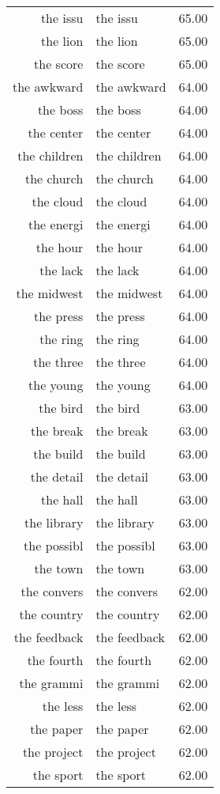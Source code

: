 \begin{table}[ht]
\begin{tabular}{rlr}
  the issu & the issu & 65.00 \\ 
  the lion & the lion & 65.00 \\ 
  the score & the score & 65.00 \\ 
  the awkward & the awkward & 64.00 \\ 
  the boss & the boss & 64.00 \\ 
  the center & the center & 64.00 \\ 
  the children & the children & 64.00 \\ 
  the church & the church & 64.00 \\ 
  the cloud & the cloud & 64.00 \\ 
  the energi & the energi & 64.00 \\ 
  the hour & the hour & 64.00 \\ 
  the lack & the lack & 64.00 \\ 
  the midwest & the midwest & 64.00 \\ 
  the press & the press & 64.00 \\ 
  the ring & the ring & 64.00 \\ 
  the three & the three & 64.00 \\ 
  the young & the young & 64.00 \\ 
  the bird & the bird & 63.00 \\ 
  the break & the break & 63.00 \\ 
  the build & the build & 63.00 \\ 
  the detail & the detail & 63.00 \\ 
  the hall & the hall & 63.00 \\ 
  the library & the library & 63.00 \\ 
  the possibl & the possibl & 63.00 \\ 
  the town & the town & 63.00 \\ 
  the convers & the convers & 62.00 \\ 
  the country & the country & 62.00 \\ 
  the feedback & the feedback & 62.00 \\ 
  the fourth & the fourth & 62.00 \\ 
  the grammi & the grammi & 62.00 \\ 
  the less & the less & 62.00 \\ 
  the paper & the paper & 62.00 \\ 
  the project & the project & 62.00 \\ 
  the sport & the sport & 62.00 \\ 

\end{tabular}
\end{table}
